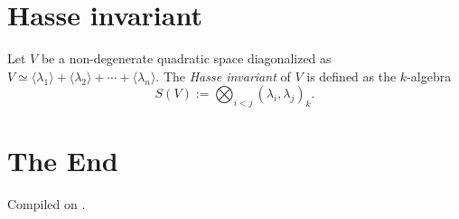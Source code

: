 \documentclass{article}
\newcommand{\qa}[2]{\left(#1\right)_{#2}}
\begin{document}
\section{Hasse invariant}

\begin{definition}
    Let $V$ be a non-degenerate quadratic space diagonalized as $V\simeq \langle\lambda_1\rangle+\langle\lambda_2\rangle+\cdots+\langle\lambda_n\rangle$. The \emph{Hasse invariant} of $V$ is defined as the $k$-algebra
    \begin{equation*}
        S(V):=\bigotimes_{i<j}\qa{\lambda_i,\lambda_j}{k}.
    \end{equation*}
\end{definition}

\section*{The End}



\noindent Compiled on \todayymd.

\noindent\home
\end{document}
